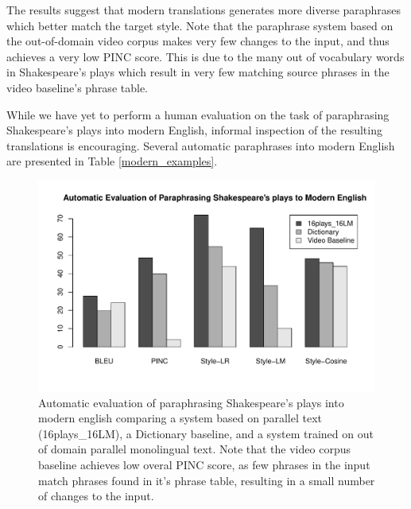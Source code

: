 \documentclass[10pt,a5paper,twoside]{article}
\begin{document}
The results suggest that modern translations generates more diverse paraphrases which better match the target style.  Note that the paraphrase system
based on the out-of-domain video corpus makes very few changes to the input, and thus achieves a very low PINC score.  This is due to the many out of
vocabulary words in Shakespeare's plays which result in very few matching source phrases in the video baseline's phrase table.

While we have yet to perform a human evaluation on the task of paraphrasing Shakespeare's plays into modern English, 
informal inspection of the resulting translations is encouraging.  Several automatic paraphrases into modern English are presented in Table \ref{modern_examples}.

\begin{figure}
  \includegraphics[width=5in]{figures/shakespeare_to_modern.pdf}
  \caption{Automatic evaluation of paraphrasing Shakespeare's plays into modern english comparing a system based on parallel text (16plays\_16LM), 
  a Dictionary baseline, and a system trained on out of domain parallel monolingual text.  Note that the video corpus baseline achieves low overal
  PINC score, as few phrases in the input match phrases found in it's phrase table, resulting in a small number of changes to the input.}
  \label{shakespeare_to_modern_automatic}
\end{figure}
\end{document}
